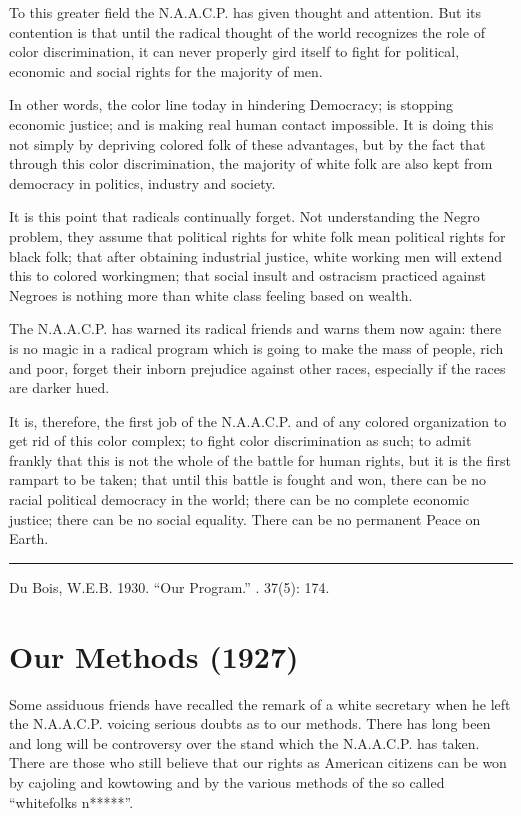 \documentclass[letterpaper,10pt,english]{jupyterBook}
\begin{document}
\sphinxAtStartPar
To this greater field the N.A.A.C.P. has given thought and attention. But its contention is that until the radical thought of the world recognizes the role of color discrimination, it can never properly gird itself to fight for political, economic and social rights for the majority of men.

\sphinxAtStartPar
In other words, the color line today in hindering Democracy; is stopping economic justice; and is making real human contact impossible. It is doing this not simply by depriving colored folk of these advantages, but by the fact that through this color discrimination, the majority of white folk are also kept from democracy in politics, industry and society.

\sphinxAtStartPar
It is this point that radicals continually forget. Not understanding the Negro problem, they assume that political rights for white folk mean political rights for black folk; that after obtaining industrial justice, white working men will extend this to colored workingmen; that social insult and ostracism practiced against Negroes is nothing more than white class feeling based on wealth.

\sphinxAtStartPar
The N.A.A.C.P. has warned its radical friends and warns them now again: there is no magic in a radical program which is going to make the mass of people, rich and poor, forget their inborn prejudice against other races, especially if the races are darker hued.

\sphinxAtStartPar
It is, therefore, the first job of the N.A.A.C.P. and of any colored organization to get rid of this color complex; to fight color discrimination as such; to admit frankly that this is not the whole of the battle for human rights, but it is the first rampart to be taken; that until this battle is fought and won, there can be no racial political democracy in the world; there can be no complete economic justice; there can be no social equality. There can be no permanent Peace on Earth.


\bigskip\hrule\bigskip


\sphinxAtStartPar
{} Du Bois, W.E.B. 1930. “Our Program.” . 37(5): 174.


\section{Our Methods (1927)}
\label{\detokenize{Volumes/33/03/our_methods:our-methods-1927}}\label{\detokenize{Volumes/33/03/our_methods::doc}}
\sphinxAtStartPar
Some assiduous friends have recalled the remark of a white secretary when he left the N.A.A.C.P. voicing serious doubts as to our methods. There has long been and long will be controversy over the stand which the N.A.A.C.P. has taken. There are those who still believe that our rights as American citizens can be won by cajoling and kow\sphinxhyphen{}towing and by the various methods of the so called “white\sphinxhyphen{}folks n*****”.
\end{document}

